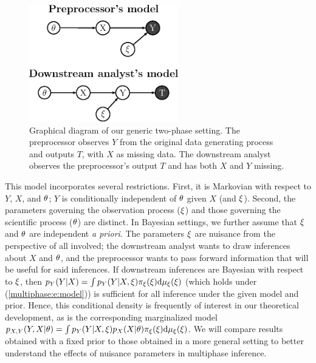 \begin{figure}
\includegraphics[height=2in]{figures/multiphase/diagram_model_vertical}
\caption{Graphical diagram of our  generic two-phase setting. The preprocessor  observes $Y$ from the original data generating process and outputs $T$, with $X$ as missing data. The downstream analyst observes the preprocessor's output $T$ and has both $X$ and $Y$ missing.\label{multiphase:fig:models}}
\end{figure}

This model incorporates several restrictions.
First, it is Markovian with respect to $Y$, $X$, and $\theta$; $Y$ is conditionally independent of $\theta$ given $X$ (and $\xi$).
Second, the parameters governing the observation process ($\xi$) and those governing the scientific process  ($\theta$) are distinct.
In Bayesian settings, we further assume that $\xi$ and $\theta$ are independent \textit{a priori}.
The parameters $\xi$ are nuisance from the perspective of all involved; the downstream analyst wants to draw inferences about $X$ and $\theta$, and the preprocessor wants to pass forward information that will be useful for said inferences.
If downstream inferences are Bayesian with respect to $\xi$, then $p_Y(Y|X) = \int p_Y(Y | X, \xi) \pi_\xi(\xi)\mathrm{d}\mu_{\xi}(\xi)$ (which holds under (\ref{multiphase:e:model})) is sufficient for all inference under the given model and prior.
Hence, this conditional density is frequently of interest in our theoretical development, as is the corresponding marginalized model $p_{X,Y}(Y, X | \theta) = \int p_Y(Y | X, \xi)  p_X(X | \theta) \pi_\xi(\xi)\mathrm{d} \mu_{\xi}(\xi)$.
We will compare results obtained with a fixed prior to those obtained in a more general setting to better understand the effects of nuisance parameters in multiphase inference.

